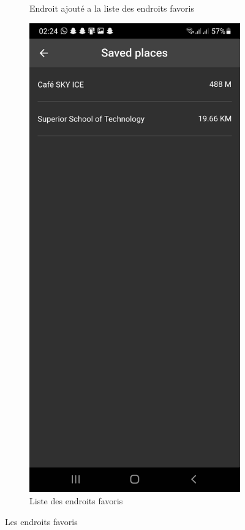 \begin{figure}[!htbp]
\begin{subfigure}[t]{.3\linewidth}
         \caption{Endroit ajouté a la liste des endroits favoris}
    \end{subfigure}
    \hfill
    \begin{subfigure}[t]{.3\linewidth}
        \centering
         \includegraphics[width=\textwidth]{assets/app/favourites/result.jpg}
         \caption{Liste des endroits favoris}
    \end{subfigure}
    \caption{Les endroits favoris}
\end{figure}

